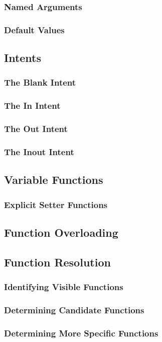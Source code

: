 \documentclass[10pt,twoside,titlepage]{article}
\begin{document}
\subsubsection{Named Arguments}
\subsubsection{Default Values}
\subsection{Intents}
\subsubsection{The Blank Intent}
\subsubsection{The In Intent}
\subsubsection{The Out Intent}
\subsubsection{The Inout Intent}
\subsection{Variable Functions}
\subsubsection{Explicit Setter Functions}
\subsection{Function Overloading}
\subsection{Function Resolution}
\subsubsection{Identifying Visible Functions}
\subsubsection{Determining Candidate Functions}
\subsubsection{Determining More Specific Functions}
\end{document}
